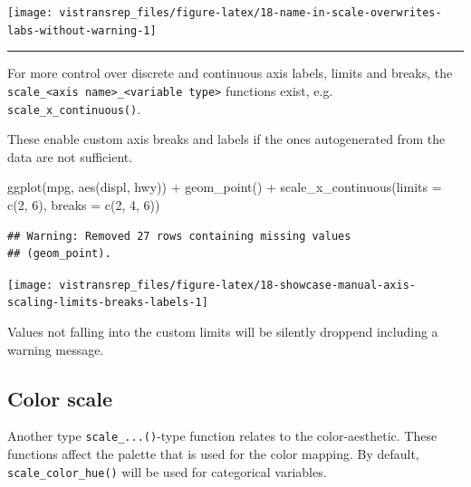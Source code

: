 \documentclass[]{book}
\newenvironment{Shaded}{}{}
\newcommand{\DataTypeTok}[1]{#1}
\newcommand{\DecValTok}[1]{#1}
\newcommand{\KeywordTok}[1]{\textcolor[rgb]{0.00,0.00,1.00}{#1}}
\newcommand{\NormalTok}[1]{#1}
\newcommand{\OperatorTok}[1]{#1}
\newcommand{\StringTok}[1]{\textcolor[rgb]{0.00,0.50,0.50}{#1}}
\begin{document}
\begin{flushright}\texttt{[image: vistransrep\_files/figure-latex/18-name-in-scale-overwrites-labs-without-warning-1]} \end{flushright}

\begin{center}\rule{0.5\linewidth}{\linethickness}\end{center}

For more control over discrete and continuous axis labels, limits and breaks, the \texttt{scale\_\textless{}axis\ name\textgreater{}\_\textless{}variable\ type\textgreater{}} functions exist, e.g. \texttt{scale\_x\_continuous()}.

These enable custom axis breaks and labels if the ones autogenerated from the data are not sufficient.

\begin{Shaded}
\begin{Highlighting}[]
\KeywordTok{ggplot}\NormalTok{(mpg, }\KeywordTok{aes}\NormalTok{(displ, hwy)) }\OperatorTok{+}
\StringTok{  }\KeywordTok{geom_point}\NormalTok{() }\OperatorTok{+}
\StringTok{  }\KeywordTok{scale_x_continuous}\NormalTok{(}\DataTypeTok{limits =} \KeywordTok{c}\NormalTok{(}\DecValTok{2}\NormalTok{, }\DecValTok{6}\NormalTok{), }\DataTypeTok{breaks =} \KeywordTok{c}\NormalTok{(}\DecValTok{2}\NormalTok{, }\DecValTok{4}\NormalTok{, }\DecValTok{6}\NormalTok{))}
\end{Highlighting}
\end{Shaded}

\begin{verbatim}
## Warning: Removed 27 rows containing missing values
## (geom_point).
\end{verbatim}

\begin{flushright}\texttt{[image: vistransrep\_files/figure-latex/18-showcase-manual-axis-scaling-limits-breaks-labels-1]} \end{flushright}

Values not falling into the custom limits will be silently droppend including a warning message.

\hypertarget{color-scale}{%
\subsection{Color scale}\label{color-scale}}

Another type \texttt{scale\_...()}-type function relates to the color-aesthetic.
These functions affect the palette that is used for the color mapping.
By default, \texttt{scale\_color\_hue()} will be used for categorical variables.
\end{document}
